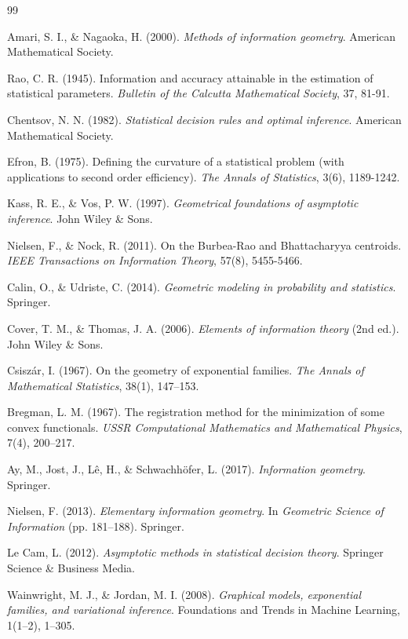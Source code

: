 \begin{thebibliography}{99}
	
	Amari, S. I., \& Nagaoka, H. (2000).
	\textit{Methods of information geometry}.
	American Mathematical Society.
	
	Rao, C. R. (1945).
	Information and accuracy attainable in the estimation of statistical parameters.
	\textit{Bulletin of the Calcutta Mathematical Society}, 37, 81-91.
	
	Chentsov, N. N. (1982).
	\textit{Statistical decision rules and optimal inference}.
	American Mathematical Society.
	
	Efron, B. (1975).
	Defining the curvature of a statistical problem (with applications to second order efficiency).
	\textit{The Annals of Statistics}, 3(6), 1189-1242.
	
	Kass, R. E., \& Vos, P. W. (1997).
	\textit{Geometrical foundations of asymptotic inference}.
	John Wiley \& Sons.
	
	Nielsen, F., \& Nock, R. (2011).
	On the Burbea-Rao and Bhattacharyya centroids.
	\textit{IEEE Transactions on Information Theory}, 57(8), 5455-5466.
	
	Calin, O., \& Udriste, C. (2014).
	\textit{Geometric modeling in probability and statistics}.
	Springer.
	
	Cover, T. M., \& Thomas, J. A. (2006).
	\textit{Elements of information theory} (2nd ed.).
	John Wiley \& Sons.
	
	Csiszár, I. (1967).
	On the geometry of exponential families.
	\textit{The Annals of Mathematical Statistics}, 38(1), 147--153.
	
	Bregman, L. M. (1967).
	The registration method for the minimization of some convex functionals.
	\textit{USSR Computational Mathematics and Mathematical Physics}, 7(4), 200--217.
	
	Ay, M., Jost, J., Lê, H., \& Schwachhöfer, L. (2017).
	\textit{Information geometry}.
	Springer.
	
	Nielsen, F. (2013).
	\textit{Elementary information geometry}.
	In \textit{Geometric Science of Information} (pp. 181--188). Springer.
	
	Le Cam, L. (2012).
	\textit{Asymptotic methods in statistical decision theory}.
	Springer Science \& Business Media.
	
	Wainwright, M. J., \& Jordan, M. I. (2008).
	\textit{Graphical models, exponential families, and variational inference}.
	Foundations and Trends in Machine Learning, 1(1--2), 1--305.

\end{thebibliography}
